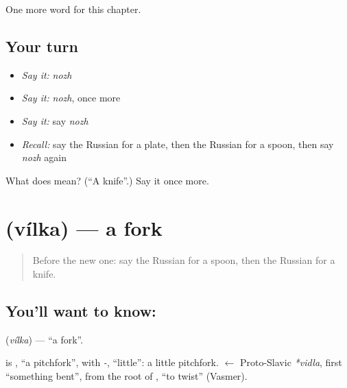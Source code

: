 \begin{grammarlens}[title={What you've built}]
One more word for this chapter.
\end{grammarlens}

\subsection*{Your turn}
\begin{itemize}
\raggedright
  \item \emph{Say it:} \emph{nozh}
  \item \emph{Say it:} \emph{nozh}, once more
  \item \emph{Say it:} say \emph{nozh}
  \item \emph{Recall:} say the Russian for a plate, then the Russian for a spoon, then say \emph{nozh} again
\end{itemize}

\begin{tcolorbox}[breakable,colback=teal!4,colframe=teal!35!black,title={Before you move on}]
What does  mean? (\textquotedblleft{}A knife\textquotedblright{}.) Say it once more.
\end{tcolorbox}
\section[\texorpdfstring{\ru{вилка} (vílka)}{вилка (vílka)}]{ (vílka) — a fork}

\label{lesson:RU-C51-fork}



\begin{quote}
Before the new one: say the Russian for a spoon, then the Russian for a knife.
\end{quote}

\subsection*{You'll want to know: }
\textbf{} (\emph{vílka}) — \textquotedblleft{}a fork\textquotedblright{}.

\begin{cousinweb}
\textbf{} is \emph{}, \textquotedblleft{}a pitchfork\textquotedblright{}, with \emph{-}, \textquotedblleft{}little\textquotedblright{}: a little pitchfork. \emph{} $\leftarrow$ Proto-Slavic \emph{*vidla}, first \textquotedblleft{}something bent\textquotedblright{}, from the root of \emph{}, \textquotedblleft{}to twist\textquotedblright{} (Vasmer).
\end{cousinweb}

